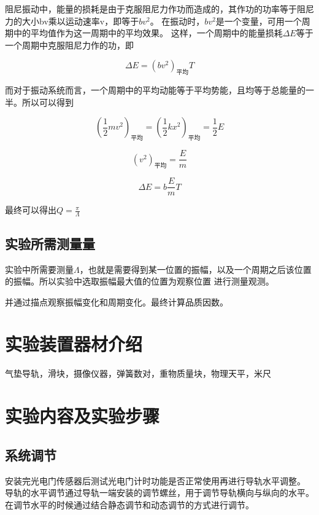 \documentclass{ctexart}
\begin{document}
    阻尼振动中，能量的损耗是由于克服阻尼力作功而造成的，其作功的功率等于阻尼力的大小bv乘以运动速率v，即等于$bv^{2}$。
    在振动时，$bv^{2}$是一个变量，可用一个周期中的平均值作为这一周期中的平均效果。
    这样，一个周期中的能量损耗$\Delta E$等于一个周期中克服阻尼力作的功，即

    $$\Delta E = (bv^{2})_{\mbox{平均}}T$$

    而对于振动系统而言，一个周期中的平均动能等于平均势能，且均等于总能量的一半。所以可以得到

    \begin{equation}
      (\frac{1}{2}mv^{2})_{\mbox{平均}} = (\frac{1}{2}kx^{2})_{\mbox{平均}} = \frac{1}{2} E
    \end{equation}

    \begin{equation}
      (v^{2})_{\mbox{平均}} = \frac{E}{m}
    \end{equation}

    \begin{equation}
      \Delta E = b \frac{E}{m} T
    \end{equation}
    
    最终可以得出$Q = \frac{\pi}{\Lambda}$

  \subsection{实验所需测量量}
  实验中所需要测量$\Lambda$，也就是需要得到某一位置的振幅，以及一个周期之后该位置的振幅。所以实验中选取振幅最大值的位置为观察位置
  进行测量观测。

  并通过描点观察振幅变化和周期变化。最终计算品质因数。


\section{实验装置器材介绍}
气垫导轨，滑块，摄像仪器，弹簧数对，重物质量块，物理天平，米尺

\section{实验内容及实验步骤}
  \subsection{系统调节}
  安装完光电门传感器后测试光电门计时功能是否正常使用再进行导轨水平调整。
  导轨的水平调节通过导轨一端安装的调节螺丝，用于调节导轨横向与纵向的水平。
  在调节水平的时候通过结合静态调节和动态调节的方式进行调节。
\end{document}
